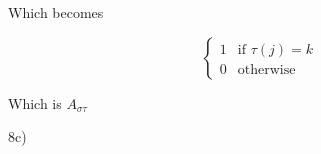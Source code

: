 \documentclass[executivepaper]{article}
\begin{document}
\begin{flushleft}
\begin{center}
\end{center}

Which becomes

\begin{center}

$$
\begin{cases}
1 & \text{if } \text{$\tau(j)=k$} \\
0 & \text{otherwise}
\end{cases}
$$

\end{center}

Which is $A_{\sigma \tau}$

\end{flushleft}

\begin{flushleft}

8c)

\end{flushleft}
\end{document}
